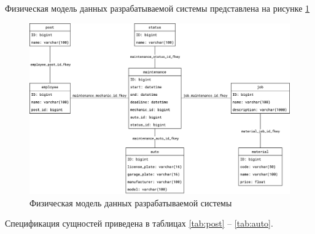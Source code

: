 \documentclass[../nirs.tex]{subfiles}
\begin{document}
Физическая модель данных разрабатываемой системы представлена на рисунке
\ref{fig:3_1_db_physical}

\clearpage
\begin{landscape}

\begin{figure}[H]
	\centering
	\includegraphics[keepaspectratio,width=\paperwidth]{./images/3_1_db_physical.png}
	\caption{Физическая модель данных разрабатываемой системы}
	\label{fig:3_1_db_physical}
\end{figure}

\end{landscape}
\clearpage

Спецификация сущностей приведена в таблицах \ref{tab:post} --
\ref{tab:auto}.







\end{document}
